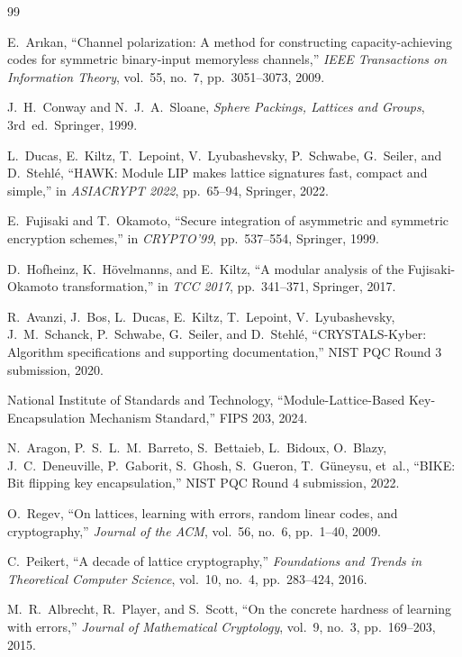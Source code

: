\documentclass[11pt,a4paper]{article}
\newcommand{\NIST}{\textsf{NIST}\xspace}
\begin{document}
\begin{thebibliography}{99}

E.~Ar{\i}kan, ``Channel polarization: A method for constructing capacity-achieving codes for symmetric binary-input memoryless channels,'' \emph{IEEE Transactions on Information Theory}, vol.~55, no.~7, pp.~3051--3073, 2009.

J.~H.~Conway and N.~J.~A.~Sloane, \emph{Sphere Packings, Lattices and Groups}, 3rd~ed.\ Springer, 1999.

L.~Ducas, E.~Kiltz, T.~Lepoint, V.~Lyubashevsky, P.~Schwabe, G.~Seiler, and D.~Stehl\'e, ``HAWK: Module LIP makes lattice signatures fast, compact and simple,'' in \emph{ASIACRYPT 2022}, pp.~65--94, Springer, 2022.

E.~Fujisaki and T.~Okamoto, ``Secure integration of asymmetric and symmetric encryption schemes,'' in \emph{CRYPTO'99}, pp.~537--554, Springer, 1999.

D.~Hofheinz, K.~H\"ovelmanns, and E.~Kiltz, ``A modular analysis of the Fujisaki-Okamoto transformation,'' in \emph{TCC 2017}, pp.~341--371, Springer, 2017.

R.~Avanzi, J.~Bos, L.~Ducas, E.~Kiltz, T.~Lepoint, V.~Lyubashevsky, J.~M.~Schanck, P.~Schwabe, G.~Seiler, and D.~Stehl\'e, ``CRYSTALS-Kyber: Algorithm specifications and supporting documentation,'' \NIST PQC Round 3 submission, 2020.

National Institute of Standards and Technology, ``Module-Lattice-Based Key-Encapsulation Mechanism Standard,'' FIPS 203, 2024.

N.~Aragon, P.~S.~L.~M.~Barreto, S.~Bettaieb, L.~Bidoux, O.~Blazy, J.~C.~Deneuville, P.~Gaborit, S.~Ghosh, S.~Gueron, T.~G\"uneysu, et~al., ``BIKE: Bit flipping key encapsulation,'' \NIST PQC Round 4 submission, 2022.

O.~Regev, ``On lattices, learning with errors, random linear codes, and cryptography,'' \emph{Journal of the ACM}, vol.~56, no.~6, pp.~1--40, 2009.

C.~Peikert, ``A decade of lattice cryptography,'' \emph{Foundations and Trends in Theoretical Computer Science}, vol.~10, no.~4, pp.~283--424, 2016.

M.~R.~Albrecht, R.~Player, and S.~Scott, ``On the concrete hardness of learning with errors,'' \emph{Journal of Mathematical Cryptology}, vol.~9, no.~3, pp.~169--203, 2015.


\end{thebibliography}
\end{document}
